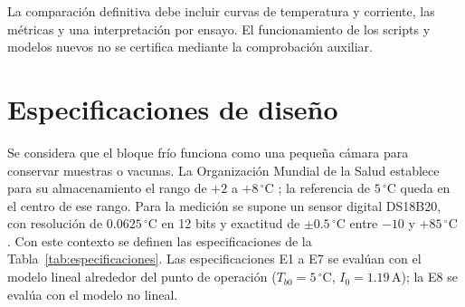 \documentclass[journal,twocolumn]{IEEEtran}
\begin{document}
La comparación definitiva debe incluir curvas de temperatura y corriente, las métricas y una interpretación por ensayo. El funcionamiento de los scripts y modelos nuevos no se certifica mediante la comprobación auxiliar.

\section{Especificaciones de diseño}\label{sec:especificaciones}
Se considera que el bloque frío funciona como una pequeña cámara para conservar muestras o vacunas. La Organización Mundial de la Salud establece para su almacenamiento el rango de $+2$ a $+8\,^\circ\mathrm C$ \cite{who_pqs}; la referencia de $5\,^\circ\mathrm C$ queda en el centro de ese rango. Para la medición se supone un sensor digital DS18B20, con resolución de $0.0625\,^\circ\mathrm C$ en 12 bits y exactitud de $\pm0.5\,^\circ\mathrm C$ entre $-10$ y $+85\,^\circ\mathrm C$ \cite{ds18b20}. Con este contexto se definen las especificaciones de la Tabla~\ref{tab:especificaciones}. Las especificaciones E1 a E7 se evalúan con el modelo lineal alrededor del punto de operación ($T_{b0}=5\,^\circ\mathrm C$, $I_0=1.19\,\mathrm A$); la E8 se evalúa con el modelo no lineal.
\end{document}
